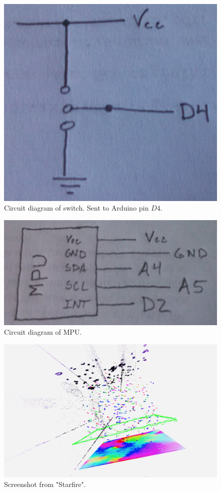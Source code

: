 \documentclass[paper=a4, fontsize=12pt]{scrartcl} 	%
\begin{document}
\begin{figure}
	\includegraphics[scale=0.16]{switch.jpg}
	\caption{\label{switch} Circuit diagram of switch.  Sent to Arduino pin $D4$.}
\end{figure}

\begin{figure}
	\includegraphics[scale=0.16]{mpu.jpg}
	\caption{\label{mpu} Circuit diagram of MPU.}
\end{figure}

\begin{figure}
	\includegraphics[scale=0.3]{starfire.png}
	\caption{\label{starfire} Screenshot from "Starfire".}
\end{figure}
\end{document}
